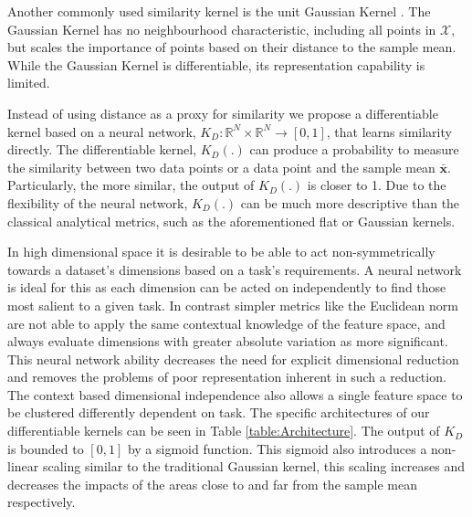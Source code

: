 \documentclass[letterpaper, 11pt]{IEEEtran}
\begin{document}
Another commonly used similarity kernel is the unit Gaussian Kernel
 \cite{Cheng1995}. The Gaussian Kernel
has no neighbourhood characteristic, including all points in $\mathcal X$, but scales the importance of points based on their distance to the sample mean. While the Gaussian Kernel is differentiable, its  representation capability is limited.

Instead of using distance as a proxy for similarity we propose a differentiable kernel based on a neural network, $K_D: \mathbb R^N\times\mathbb R^{N} \rightarrow [0,1]$, that learns similarity directly. 
The differentiable kernel, $K_D(.)$ can produce a probability to measure the similarity between two data points or a data point and the sample mean $\bar {\mathbf x}$. Particularly, the more similar, the output of $K_D(.)$ is closer to 1. Due to the flexibility of the neural network, $K_D(.)$ can be much more descriptive than the classical analytical metrics, such as the aforementioned flat or Gaussian kernels. 

In high dimensional space it is desirable to be able to act non-symmetrically towards a dataset's dimensions based on a task's requirements. 
A neural network is ideal for this as each dimension can be acted on independently to find those most salient to a given task. 
In contrast simpler metrics like the Euclidean norm are not able to apply the same contextual knowledge of the feature space, and always evaluate dimensions with greater absolute variation as more significant.
This neural network ability decreases the need for explicit dimensional reduction and removes the problems of poor representation inherent in such a reduction.
The context based dimensional independence also allows a single feature space to be clustered differently dependent on task.
The specific architectures of our differentiable kernels can be seen in Table \ref{table:Architecture}.
The output of $K_D$ is bounded to $[0,1]$ by a sigmoid function. This sigmoid also introduces a non-linear scaling similar to the traditional Gaussian kernel, this scaling increases and decreases the impacts of the areas close to and far from the sample mean respectively.
  \begin{table}
          \centering
          \caption{Differential subtraction and concatenation based kernel architectures, as described in Section \ref{ablation}.}
          
            \label{table:Architecture_sub}
        \label{table:Architecture}
    \end{table}
\end{document}
